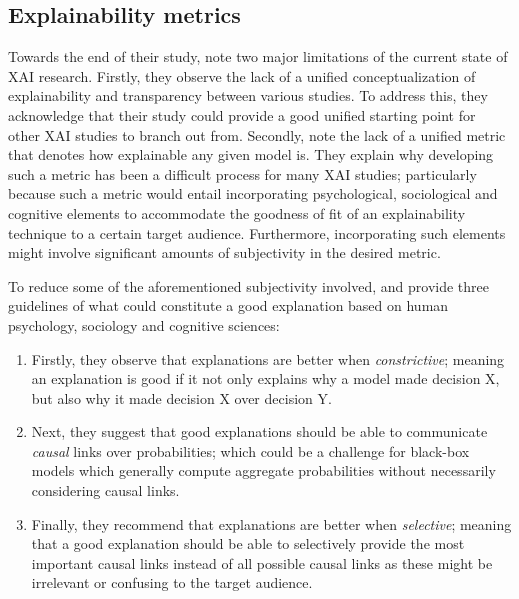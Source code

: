 \subsection{Explainability metrics}

\label{section:xai_metrics}

Towards the end of their study, \citet{arrieta2020explainable} note two major
limitations of the current state of XAI research. Firstly, they observe the lack
of a unified conceptualization of explainability and transparency between
various studies. To address this, they acknowledge that their study could
provide a good unified starting point for other XAI studies to branch out from.
Secondly, \citet{arrieta2020explainable} note the lack of a unified metric that
denotes how explainable any given model is. They explain why developing
such a metric has been a difficult process for many XAI studies; particularly
because such a metric would entail incorporating psychological, sociological and
cognitive elements to accommodate the goodness of fit of an explainability
technique to a certain target audience. Furthermore, incorporating such elements
might involve significant amounts of subjectivity in the desired metric.

To reduce some of the aforementioned subjectivity involved, \citet{MILLER20191}
and \citet{arrieta2020explainable} provide three guidelines of what could
constitute a good explanation based on human psychology, sociology and cognitive
sciences:

\begin{enumerate}
  \item Firstly, they observe that explanations are better when
  \textit{constrictive}; meaning an explanation is good if it not only explains
  why a model made decision X, but also why it made decision X over decision Y.

  \item Next, they suggest that good explanations should be able to communicate
  \textit{causal} links over probabilities; which could be a challenge for black-box
  models which generally compute aggregate probabilities without necessarily
  considering causal links.

  \item Finally, they recommend that explanations are better when
  \textit{selective}; meaning that a good explanation should be able to
  selectively provide the most important causal links instead of all possible
  causal links as these might be irrelevant or confusing to the target audience.
\end{enumerate}

